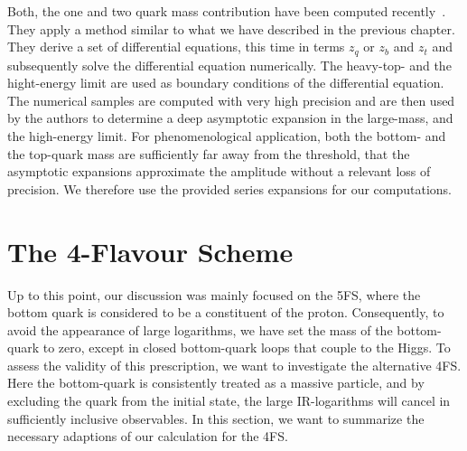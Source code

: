 Both, the one and two quark mass contribution have been computed recently~\cite{Czakon:2020vql,Niggetiedt:2023ywb}. They apply a method similar to what we have described in the previous chapter. They derive a set of differential equations, this time in terms $z_q$ or $z_b$ and $z_t$ and subsequently solve the differential equation numerically. The heavy-top- and the hight-energy limit are used as boundary conditions of the differential equation. The numerical samples are computed with very high precision and are then used by the authors to determine a deep asymptotic expansion in the large-mass, and the high-energy limit. For phenomenological application, both the bottom- and the top-quark mass are sufficiently far away from the threshold, that the asymptotic expansions approximate the amplitude without a relevant loss of precision. We therefore use the provided series expansions for our computations.

\section{The 4-Flavour Scheme}\label{sec:5:4FS}
Up to this point, our discussion was mainly focused on the 5\acs{FS}, where the bottom quark is considered to be a constituent of the proton. Consequently, to avoid the appearance of large logarithms, we have set the mass of the bottom-quark to zero, except in closed bottom-quark loops that couple to the Higgs. To assess the validity of this prescription, we want to investigate the alternative 4\acs{FS}. Here the bottom-quark is consistently treated as a massive particle, and by excluding the quark from the initial state, the large \acs{IR}-logarithms will cancel in sufficiently inclusive observables. In this section, we want to summarize the necessary adaptions of our calculation for the 4\acs{FS}.

